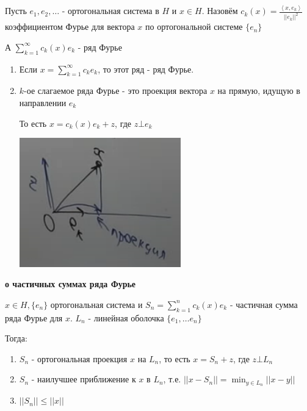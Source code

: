 \begin{definition}
    Пусть $e_1, e_2, \ldots$ - ортогональная система в $H$ и $x \in H$. Назовём $c_k (x) = \frac{\left < x, e_k \right >}{||e_k||^2}$ коэффициентом Фурье для вектора $x$ по ортогональной системе $\{ e_n \}$

    А $\sum_{k = 1}^\infty c_k (x) e_k $ - ряд Фурье
\end{definition}

\begin{remark}
    \begin{enumerate}
        \item {
            Если $x = \sum_{k = 1}^\infty c_k e_k$, то этот ряд - ряд Фурье.
        }
        \item {
            $k$-ое слагаемое ряда Фурье - это проекция вектора $x$ на прямую, идущую в направлении $e_k$

            То есть $x = c_k(x) e_k + z$, где $z \bot e_k$

            \begin{center}
                \includegraphics[width=7cm]{./assets/05-fourierreihe/projection-of-x.png}
            \end{center}
        }
    \end{enumerate}
\end{remark}

\begin{theorem}
    \textbf{о частичных суммах ряда Фурье}

    $x \in H, \{ e_n \}$ ортогональная система и $S_n = \sum_{k = 1}^n c_k (x) e_k $ - частичная сумма ряда Фурье для $x$.
    $L_n$ - линейная оболочка $\{ e_1, \ldots e_n \}$

    Тогда:
    \begin{enumerate}
        \item $S_n$ - ортогональная проекция $x$ на $L_n$, то есть $x = S_n + z$, где $z \bot L_n$
        \item $S_n$ - наилучшее приближение к $x$ в $L_n$, т.е. $||x - S_n|| = \min_{y \in L_n} ||x - y||$
        \item $||S_n|| \leqslant ||x||$
    \end{enumerate}
    
\end{theorem}

